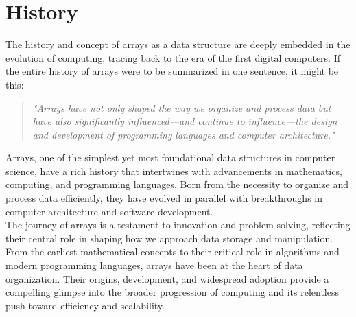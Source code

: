 \documentclass[12pt, oneside]{book}
\begin{document}
	\section{History}
	The history and concept of arrays as a data structure are deeply embedded in the evolution of computing, tracing back to the era of the first digital computers. If the entire history of arrays were to be summarized in one sentence, it might be this: 
	\begin{quote}
		\textit{"Arrays have not only shaped the way we organize and process data but have also significantly influenced—and continue to influence—the design and development of programming languages and computer architecture."}
	\end{quote}
	Arrays, one of the simplest yet most foundational data structures in computer science, have a rich history that intertwines with advancements in mathematics, computing, and programming languages. Born from the necessity to organize and process data efficiently, they have evolved in parallel with breakthroughs in computer architecture and software development. \\
	The journey of arrays is a testament to innovation and problem-solving, reflecting their central role in shaping how we approach data storage and manipulation. From the earliest mathematical concepts to their critical role in algorithms and modern programming languages, arrays have been at the heart of data organization. Their origins, development, and widespread adoption provide a compelling glimpse into the broader progression of computing and its relentless push toward efficiency and scalability.
\end{document}
